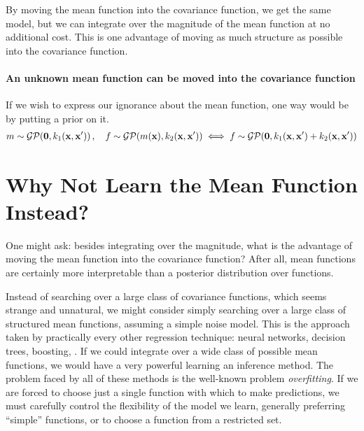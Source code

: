 By moving the mean function into the covariance function, we get the same model, but we can integrate over the magnitude of the mean function at no additional cost.
This is one advantage of moving as much structure as possible into the covariance function.

\paragraph{An unknown mean function can be moved into the covariance function}

If we wish to express our ignorance about the mean function, one way would be by putting a \gp{} prior on it.
%
\begin{align}
m \sim \mathcal{GP}\!\left({\bf{0}},k_1({\bf{x}},{\bf{x}}')\right), \quad
f \sim \mathcal{GP}\!\left(m({\bf{x}}),k_2({\bf{x}},{\bf{x}}')\right)
\iff 
f \sim \mathcal{GP}\!\left({\bf{0}},k_1({\bf{x}},{\bf{x}}') + k_2({\bf{x}},{\bf{x}}')\right)
\end{align}


\section{Why Not Learn the Mean Function Instead?}
One might ask: besides integrating over the magnitude, what is the advantage of moving the mean function into the covariance function?
After all, mean functions are certainly more interpretable than a posterior distribution over functions.

Instead of searching over a large class of covariance functions, which seems strange and unnatural, we might consider simply searching over a large class of structured mean functions, assuming a simple \iid noise model.
This is the approach taken by practically every other regression technique: neural networks, decision trees, boosting, \etc.
If we could integrate over a wide class of possible mean functions, we would have a very powerful learning an inference method.
The problem faced by all of these methods is the well-known problem \emph{overfitting}.
If we are forced to choose just a single function with which to make predictions, we must carefully control the flexibility of the model we learn, generally preferring ``simple'' functions, or to choose a function from a restricted set.

